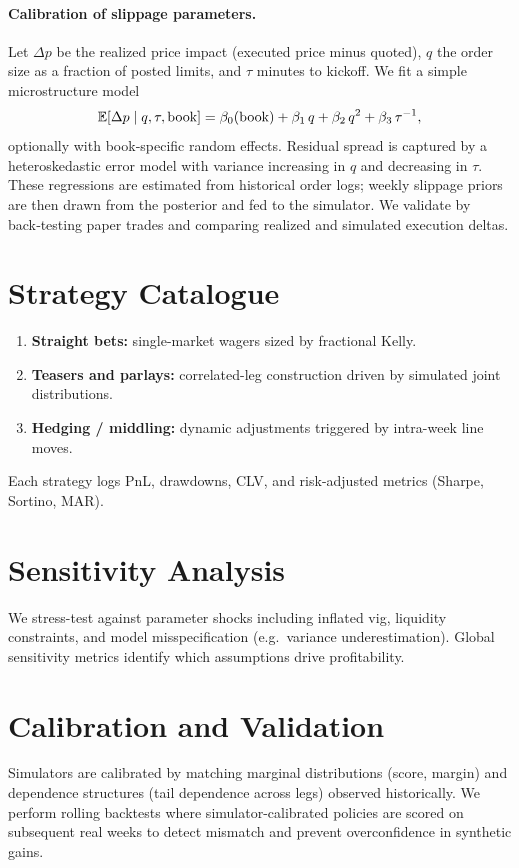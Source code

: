 \paragraph{Calibration of slippage parameters.}
Let $\Delta p$ be the realized price impact (executed price minus quoted), $q$ the order size as a fraction of posted limits, and $\tau$ minutes to kickoff. We fit a simple microstructure model
\[\mathbb{E}[\Delta p\mid q,\tau,\text{book}]=\beta_0(\text{book})+\beta_1\,q+\beta_2\,q^2+\beta_3\,\tau^{-1},\]
optionally with book‑specific random effects. Residual spread is captured by a heteroskedastic error model with variance increasing in $q$ and decreasing in $\tau$. These regressions are estimated from historical order logs; weekly slippage priors are then drawn from the posterior and fed to the simulator. We validate by back‑testing paper trades and comparing realized and simulated execution deltas.


\section{Strategy Catalogue}
\begin{enumerate}
  \item \textbf{Straight bets:} single-market wagers sized by fractional Kelly.
  \item \textbf{Teasers and parlays:} correlated-leg construction driven by simulated joint distributions.
  \item \textbf{Hedging / middling:} dynamic adjustments triggered by intra-week line moves.
\end{enumerate}
Each strategy logs PnL, drawdowns, CLV, and risk-adjusted metrics (Sharpe, Sortino, MAR).

\section{Sensitivity Analysis}
We stress-test against parameter shocks including inflated vig, liquidity constraints, and model misspecification (e.g.\ variance underestimation). Global sensitivity metrics identify which assumptions drive profitability.

\section{Calibration and Validation}
Simulators are calibrated by matching marginal distributions (score, margin) and dependence structures (tail dependence across legs) observed historically. We perform rolling backtests where simulator-calibrated policies are scored on subsequent real weeks to detect mismatch and prevent overconfidence in synthetic gains.

